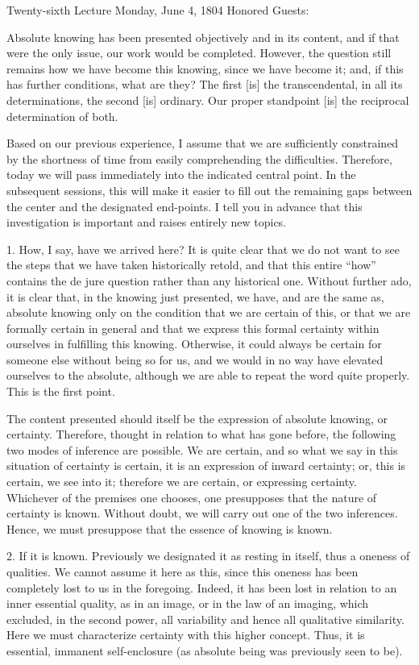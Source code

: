 Twenty-sixth Lecture
Monday, June 4, 1804
Honored Guests:

Absolute knowing has been presented
objectively and in its content,
and if that were the only issue,
our work would be completed.
However, the question still remains
how we have become this knowing,
since we have become it;
and, if this has further conditions,
what are they?
The first [is] the transcendental,
in all its determinations,
the second [is] ordinary.
Our proper standpoint [is]
the reciprocal determination of both.

Based on our previous experience,
I assume that we are sufficiently
constrained by the shortness of time
from easily comprehending the difficulties.
Therefore, today we will pass immediately
into the indicated central point.
In the subsequent sessions,
this will make it easier to fill out
the remaining gaps between the center
and the designated end-points.
I tell you in advance that
this investigation is important
and raises entirely new topics.

1. How, I say, have we arrived here?
It is quite clear that we do not want
to see the steps that we have taken historically retold,
and that this entire “how” contains the de jure question
rather than any historical one.
Without further ado, it is clear that,
in the knowing just presented,
we have, and are the same as, absolute knowing
only on the condition that we are certain of this,
or that we are formally certain in general
and that we express this formal certainty
within ourselves in fulfilling this knowing.
Otherwise, it could always be certain
for someone else without being so for us,
and we would in no way have elevated
ourselves to the absolute,
although we are able to
repeat the word quite properly.
This is the first point.

The content presented should itself be
the expression of absolute knowing, or certainty.
Therefore, thought in relation to what has gone before,
the following two modes of inference are possible.
We are certain, and so what we say
in this situation of certainty is certain,
it is an expression of inward certainty;
or, this is certain, we see into it;
therefore we are certain, or expressing certainty.
Whichever of the premises one chooses,
one presupposes that the nature of certainty is known.
Without doubt, we will carry out one of the two inferences.
Hence, we must presuppose that the essence of knowing is known.

2. If it is known.
Previously we designated it as resting in itself,
thus a oneness of qualities.
We cannot assume it here as this,
since this oneness has been
completely lost to us in the foregoing.
Indeed, it has been lost in relation to
an inner essential quality, as in an image,
or in the law of an imaging,
which excluded, in the second power,
all variability and hence all qualitative similarity.
Here we must characterize certainty with this higher concept.
Thus, it is essential, immanent self-enclosure
(as absolute being was previously seen to be).

